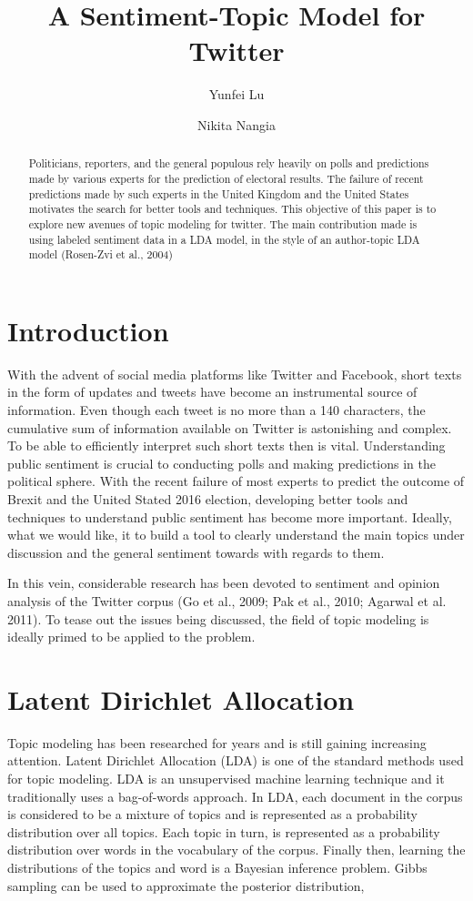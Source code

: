 \documentclass[12pt]{amsart}
\title[author-LDA with sentiment]
{A Sentiment-Topic Model for Twitter}
\author{Yunfei Lu}
\author{Nikita Nangia}
\newcommand{\0}{\mat{0}}
\newcommand{\1}{\mathds{1}}
\begin{document}
\begin{abstract}
  Politicians, reporters, and the general populous rely heavily on polls and predictions made by various experts for the prediction of electoral results. The failure of recent predictions made by such experts in the United Kingdom and the United States motivates the search for better tools and techniques. This objective of this paper is to explore new avenues of topic modeling for twitter. The main contribution made is using labeled sentiment data in a LDA model, in the style of an author-topic LDA model (Rosen-Zvi et al., 2004)

\end{abstract}

\maketitle

\section{Introduction}
With the advent of social media platforms like Twitter and Facebook, short texts in the form of updates and tweets have become an instrumental source of information. Even though each tweet is no more than a 140 characters, the cumulative sum of information available on Twitter is astonishing and complex. To be able to efficiently interpret such short texts then is vital. Understanding public sentiment is crucial to conducting polls and making predictions in the political sphere. With the recent failure of most experts to predict the outcome of Brexit and the United Stated 2016 election, developing better tools and techniques to understand public sentiment has become more important. Ideally, what we would like, it to build a tool to clearly understand the main topics under discussion and the general sentiment towards with regards to them.

In this vein, considerable research has been devoted to sentiment and opinion analysis of the Twitter corpus (Go et al., 2009; Pak et al., 2010; Agarwal et al. 2011). To tease out the issues being discussed, the field of topic modeling is ideally primed to be applied to the problem. 


\section{Latent Dirichlet Allocation}
Topic modeling has been researched for years and is still gaining increasing attention. Latent Dirichlet Allocation (LDA) is one of the standard methods used for topic modeling. LDA is an unsupervised machine learning technique and it traditionally uses a bag-of-words approach. In LDA, each document in the corpus is considered to be a mixture of topics and is represented as a probability distribution over all topics. Each topic in turn, is represented as a probability distribution over words in the vocabulary of the corpus. Finally then, learning the distributions of the topics and word is a Bayesian inference problem. Gibbs sampling can be used to approximate the posterior distribution, 
\end{document}
